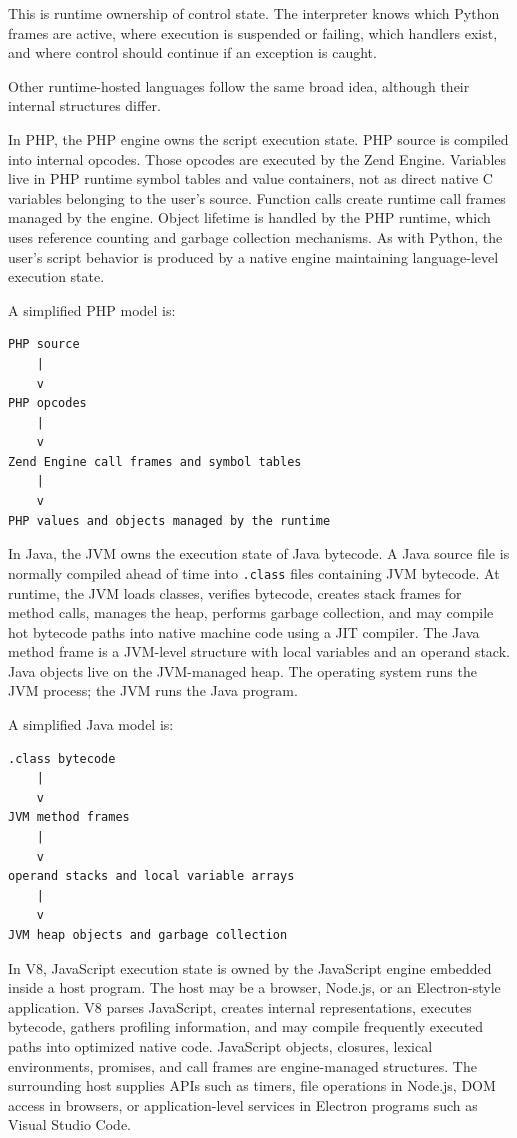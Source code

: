 \documentclass[a4paper,twoside]{report}
\begin{document}
This is runtime ownership of control state. The interpreter knows which Python frames are active, where execution is suspended or failing, which handlers exist, and where control should continue if an exception is caught.

Other runtime-hosted languages follow the same broad idea, although their internal structures differ.

In PHP, the PHP engine owns the script execution state. PHP source is compiled into internal opcodes. Those opcodes are executed by the Zend Engine. Variables live in PHP runtime symbol tables and value containers, not as direct native C variables belonging to the user's source. Function calls create runtime call frames managed by the engine. Object lifetime is handled by the PHP runtime, which uses reference counting and garbage collection mechanisms. As with Python, the user's script behavior is produced by a native engine maintaining language-level execution state.

A simplified PHP model is:

\begin{verbatim}
PHP source
    |
    v
PHP opcodes
    |
    v
Zend Engine call frames and symbol tables
    |
    v
PHP values and objects managed by the runtime
\end{verbatim}

In Java, the JVM owns the execution state of Java bytecode. A Java source file is normally compiled ahead of time into \texttt{.class} files containing JVM bytecode. At runtime, the JVM loads classes, verifies bytecode, creates stack frames for method calls, manages the heap, performs garbage collection, and may compile hot bytecode paths into native machine code using a JIT compiler. The Java method frame is a JVM-level structure with local variables and an operand stack. Java objects live on the JVM-managed heap. The operating system runs the JVM process; the JVM runs the Java program.

A simplified Java model is:

\begin{verbatim}
.class bytecode
    |
    v
JVM method frames
    |
    v
operand stacks and local variable arrays
    |
    v
JVM heap objects and garbage collection
\end{verbatim}

In V8, JavaScript execution state is owned by the JavaScript engine embedded inside a host program. The host may be a browser, Node.js, or an Electron-style application. V8 parses JavaScript, creates internal representations, executes bytecode, gathers profiling information, and may compile frequently executed paths into optimized native code. JavaScript objects, closures, lexical environments, promises, and call frames are engine-managed structures. The surrounding host supplies APIs such as timers, file operations in Node.js, DOM access in browsers, or application-level services in Electron programs such as Visual Studio Code.
\end{document}
